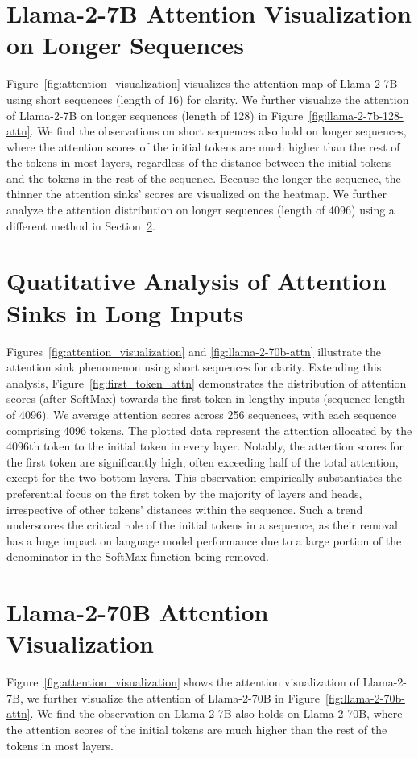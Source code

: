 \section{Llama-2-7B Attention Visualization on Longer Sequences}

Figure~\ref{fig:attention_visualization} visualizes the attention map of Llama-2-7B using short sequences (length of 16) for clarity. We further visualize the attention of Llama-2-7B on longer sequences (length of 128) in Figure~\ref{fig:llama-2-7b-128-attn}. We find the observations on short sequences also hold on longer sequences, where the attention scores of the initial tokens are much higher than the rest of the tokens in most layers, regardless of the distance between the initial tokens and the tokens in the rest of the sequence. Because the longer the sequence, the thinner the attention sinks' scores are visualized on the heatmap. We further analyze the attention distribution on longer sequences (length of 4096) using a different method in Section~\ref{sec:quantitative_analysis}.

\section{Quatitative Analysis of Attention Sinks in Long Inputs}
\label{sec:quantitative_analysis}

Figures~\ref{fig:attention_visualization} and \ref{fig:llama-2-70b-attn} illustrate the attention sink phenomenon using short sequences for clarity. Extending this analysis, Figure~\ref{fig:first_token_attn} demonstrates the distribution of attention scores (after SoftMax) towards the first token in lengthy inputs (sequence length of 4096). We average attention scores across 256 sequences, with each sequence comprising 4096 tokens. The plotted data represent the attention allocated by the 4096th token to the initial token in every layer. Notably, the attention scores for the first token are significantly high, often exceeding half of the total attention, except for the two bottom layers. This observation empirically substantiates the preferential focus on the first token by the majority of layers and heads, irrespective of other tokens' distances within the sequence. Such a trend underscores the critical role of the initial tokens in a sequence, as their removal has a huge impact on language model performance due to a large portion of the denominator in the SoftMax function being removed.

\section{Llama-2-70B Attention Visualization}

Figure~\ref{fig:attention_visualization} shows the attention visualization of Llama-2-7B, we further visualize the attention of Llama-2-70B in Figure~\ref{fig:llama-2-70b-attn}. We find the observation on Llama-2-7B also holds on Llama-2-70B, where the attention scores of the initial tokens are much higher than the rest of the tokens in most layers.

